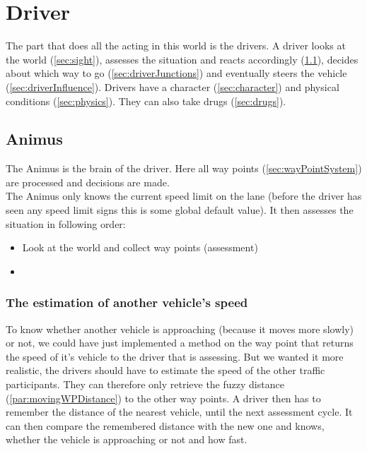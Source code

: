 
\section{Driver}
\label{sec:driver}

The part that does all the acting in this world is the drivers. A
driver looks at the world (\ref{sec:sight}), assesses the situation
and reacts accordingly (\ref{sec:animus}), decides about which
way to go (\ref{sec:driverJunctions}) and eventually steers the
vehicle (\ref{sec:driverInfluence}). Drivers have a character
(\ref{sec:character}) and physical conditions (\ref{sec:physics}). They
can also take drugs (\ref{sec:drugs}). \\

\subsection{Animus}
\label{sec:animus}

The Animus is the brain of the driver. Here all way points 
(\ref{sec:wayPointSystem}) are processed and decisions are made. \\

\noindent The Animus only knows the current speed limit on the lane 
(before the driver has seen any speed limit signs this is some global
default value). It then assesses the situation in following order:

\begin{itemize}
\item Look at the world and collect way points (assessment)
\item 
\end{itemize}

\subsubsection{The estimation of another vehicle's speed}

To know whether another vehicle is approaching (because it moves 
more slowly) or not, we could have just implemented a method on the
way point that returns the speed of it's vehicle to the driver that
is assessing. But we wanted it more realistic, the drivers should have
to estimate the speed of the other traffic participants. They can
therefore only retrieve the fuzzy distance (\ref{par:movingWPDistance})
to the other way points. A driver then has to remember the distance
of the nearest vehicle, until the next assessment cycle. It can then
compare the remembered distance with the new one and knows, whether the
vehicle is approaching or not and how fast.

